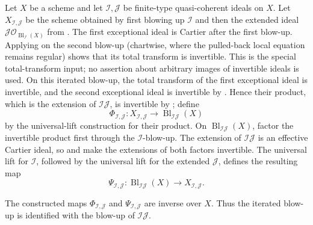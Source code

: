 \begin{definition}
  \label{def:nagata-blowup-product-comparison}

  Let $X$ be a scheme and let $\mathcal I,\mathcal J$ be finite-type
  quasi-coherent ideals on $X$.  Let $X_{\mathcal I,\mathcal J}$ be the
  scheme obtained by first blowing up $\mathcal I$ and then the extended
  ideal $\mathcal J\mathcal O_{\operatorname{Bl}_{\mathcal I}(X)}$ from
  .
  The first exceptional ideal is Cartier after the first blow-up.  Applying
   on the second blow-up
  (chartwise, where the pulled-back local equation remains regular) shows
  that its total transform is invertible.  This is the special total-transform
  input; no assertion about arbitrary images of invertible ideals is used.
  On this iterated blow-up, the total transform
  of the first exceptional ideal is invertible, and the second exceptional
  ideal is invertible by .
  Hence their product, which is the extension of
  $\mathcal I\mathcal J$, is invertible by
  ; define
  \[
    \Phi_{\mathcal I,\mathcal J}\colon
      X_{\mathcal I,\mathcal J}
      \longrightarrow\operatorname{Bl}_{\mathcal I\mathcal J}(X)
  \]
  by the universal-lift construction for their product.  On
  $\operatorname{Bl}_{\mathcal I\mathcal J}(X)$, factor the invertible
  product first through the $\mathcal I$-blow-up.  The extension of
  $\mathcal I\mathcal J$ is an effective Cartier ideal, so
   and
   make the extensions
  of both factors invertible.  The universal lift for $\mathcal I$, followed
  by the universal lift for the extended $\mathcal J$, defines the resulting
  map
  \[
    \Psi_{\mathcal I,\mathcal J}\colon
      \operatorname{Bl}_{\mathcal I\mathcal J}(X)
      \longrightarrow X_{\mathcal I,\mathcal J}.
  \]
\end{definition}

\begin{theorem}
  \label{thm:nagata-blowup-product-ideal}

  The constructed maps $\Phi_{\mathcal I,\mathcal J}$ and
  $\Psi_{\mathcal I,\mathcal J}$ are inverse over $X$.  Thus the iterated
  blow-up is identified with the blow-up of $\mathcal I\mathcal J$.
\end{theorem}

